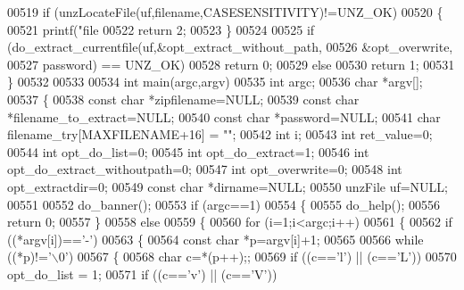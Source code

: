 \begin{DoxyCode}
{{{{{{{{{{{{{{{{{{{00519     \textcolor{keywordflow}{if} (unzLocateFile(uf,filename,CASESENSITIVITY)!=UNZ\_OK)
00520     \{
00521         printf(\textcolor{stringliteral}{"file %
00522         \textcolor{keywordflow}{return} 2;
00523     \}
00524 
00525     \textcolor{keywordflow}{if} (do\_extract\_currentfile(uf,&opt\_extract\_without\_path,
00526                                       &opt\_overwrite,
00527                                       password) == UNZ\_OK)
00528         \textcolor{keywordflow}{return} 0;
00529     \textcolor{keywordflow}{else}
00530         \textcolor{keywordflow}{return} 1;
00531 \}
00532 
00533 
00534 \textcolor{keywordtype}{int} main(argc,argv)
00535     \textcolor{keywordtype}{int} argc;
00536     \textcolor{keywordtype}{char} *argv[];
00537 \{
00538     \textcolor{keyword}{const} \textcolor{keywordtype}{char} *zipfilename=NULL;
00539     \textcolor{keyword}{const} \textcolor{keywordtype}{char} *filename\_to\_extract=NULL;
00540     \textcolor{keyword}{const} \textcolor{keywordtype}{char} *password=NULL;
00541     \textcolor{keywordtype}{char} filename\_try[MAXFILENAME+16] = \textcolor{stringliteral}{""};
00542     \textcolor{keywordtype}{int} i;
00543     \textcolor{keywordtype}{int} ret\_value=0;
00544     \textcolor{keywordtype}{int} opt\_do\_list=0;
00545     \textcolor{keywordtype}{int} opt\_do\_extract=1;
00546     \textcolor{keywordtype}{int} opt\_do\_extract\_withoutpath=0;
00547     \textcolor{keywordtype}{int} opt\_overwrite=0;
00548     \textcolor{keywordtype}{int} opt\_extractdir=0;
00549     \textcolor{keyword}{const} \textcolor{keywordtype}{char} *dirname=NULL;
00550     unzFile uf=NULL;
00551 
00552     do\_banner();
00553     \textcolor{keywordflow}{if} (argc==1)
00554     \{
00555         do\_help();
00556         \textcolor{keywordflow}{return} 0;
00557     \}
00558     \textcolor{keywordflow}{else}
00559     \{
00560         \textcolor{keywordflow}{for} (i=1;i<argc;i++)
00561         \{
00562             \textcolor{keywordflow}{if} ((*argv[i])==\textcolor{charliteral}{'-'})
00563             \{
00564                 \textcolor{keyword}{const} \textcolor{keywordtype}{char} *p=argv[i]+1;
00565 
00566                 \textcolor{keywordflow}{while} ((*p)!=\textcolor{charliteral}{'\(\backslash\)0'})
00567                 \{
00568                     \textcolor{keywordtype}{char} c=*(p++);;
00569                     \textcolor{keywordflow}{if} ((c==\textcolor{charliteral}{'l'}) || (c==\textcolor{charliteral}{'L'}))
00570                         opt\_do\_list = 1;
00571                     \textcolor{keywordflow}{if} ((c==\textcolor{charliteral}{'v'}) || (c==\textcolor{charliteral}{'V'}))
}}}}}}}}}}}}}}}}}}}}
\end{DoxyCode}
